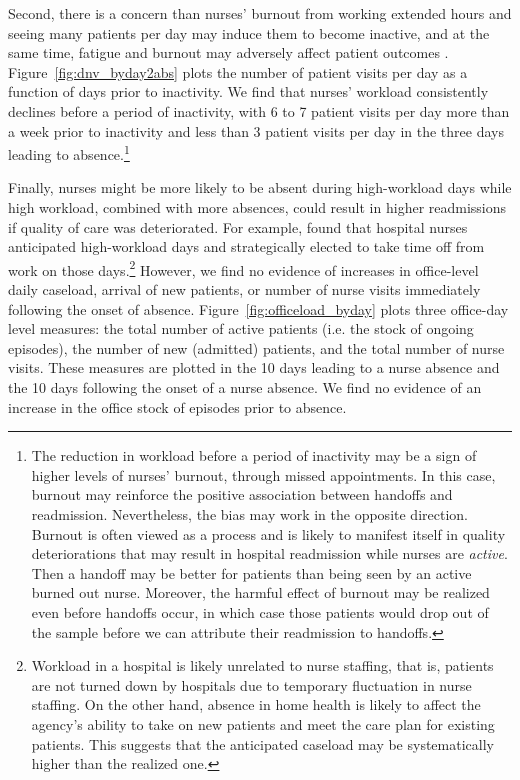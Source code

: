 \documentclass[final,12pt, notitlepage]{article}
\begin{document}
Second, there is a concern than nurses' burnout from working extended hours and seeing many patients per day may induce them to become inactive, and at the same time, fatigue and burnout may adversely affect patient outcomes \citep{Aiken2002}. Figure~\ref{fig:dnv_byday2abs} plots the number of patient visits per day as a function of days prior to inactivity. We find that nurses' workload consistently declines before a period of inactivity, with 6 to 7 patient visits per day more than a week prior to inactivity and less than 3 patient visits per day in the three days leading to absence.\footnote{The reduction in workload before a period of inactivity may be a sign of higher levels of nurses' burnout, through missed appointments. In this case, burnout may reinforce the positive association between handoffs and readmission. Nevertheless, the bias may work in the opposite direction. Burnout is often viewed as a process and is likely to manifest itself in quality deteriorations that may result in hospital readmission while nurses are \textit{active}. Then a handoff may be better for patients than being seen by an active burned out nurse. Moreover, the harmful effect of burnout may be realized even before handoffs occur, in which case those patients would drop out of the sample before we can attribute their readmission to handoffs.}




Finally, nurses might be more likely to be absent during high-workload days while high workload, combined with more absences, could result in higher readmissions if quality of care was deteriorated.
For example, \citet{Green2013} found that hospital nurses anticipated high-workload days and strategically elected to take time off from work on those days.\footnote{Workload in a hospital is likely unrelated to nurse staffing, that is, patients are not turned down by hospitals due to temporary fluctuation in nurse staffing. On the other hand, absence in home health is likely to affect the agency's ability to take on new patients and meet the care plan for existing patients. This suggests that the anticipated caseload may be systematically higher than the realized one.}
However, we find no evidence of increases in office-level daily caseload, arrival of new patients, or number of nurse visits immediately following the onset of absence.
Figure~\ref{fig:officeload_byday} plots three office-day level measures: the total number of active patients (i.e. the stock of ongoing episodes), the number of new (admitted) patients, and the total number of nurse visits. These measures are plotted in the 10 days leading to a nurse absence and the 10 days following the onset of a nurse absence.
We find no evidence of an increase in the office stock of episodes prior to absence.
\end{document}
